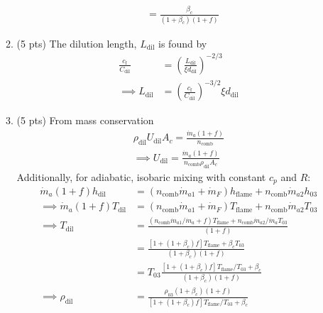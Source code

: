 \documentclass[12pt]{article}
\begin{document}
\begin{enumerate}[label=(\alph*)]
\begin{enumerate}[label=(\roman*)]
\begin{equation}
\begin{aligned}
							&=\boxed{\frac{\beta_c}{(1+\beta_c)(1+f)}}
						\end{aligned}
					\end{equation}
				\item (5 pts)
					The dilution length, $L_\mathrm{dil}$ is found by
					\begin{equation}
						\begin{aligned}
							\frac{c_\mathrm{f}}{C_\mathrm{dil}}&=\left(\frac{L_\mathrm{dil}}{\xi d_\mathrm{dil}}\right)^{-2/3} \\
							\implies L_\mathrm{dil}&=\boxed{\left(\frac{c_\mathrm{f}}{C_\mathrm{dil}}\right)^{-3/2}\xi d_\mathrm{dil}}
						\end{aligned}
					\end{equation}
				\item (5 pts)
					From mass conservation
					\begin{equation}
						\begin{aligned}
							\rho_\mathrm{dil}U_\mathrm{dil}A_c=\frac{\dot{m}_{a}(1+f)}{n_\mathrm{comb}}\\
							\implies U_\mathrm{dil}=\boxed{\frac{\dot{m}_{a}(1+f)}{n_\mathrm{comb}\rho_\mathrm{dil}A_c}}
						\end{aligned}
					\end{equation}
					Additionally, for adiabatic, isobaric mixing with constant $c_p$ and $R$: 
					\begin{equation}
						\begin{aligned}
							\dot{m}_{a}(1+f)h_\mathrm{dil}&=(n_\mathrm{comb}\dot{m}_{a1}+\dot{m}_F)h_\mathrm{flame}+n_\mathrm{comb}\dot{m}_{a2}h_{03}\\
							\implies \dot{m}_{a}(1+f)T_\mathrm{dil}&=(n_\mathrm{comb}\dot{m}_{a1}+\dot{m}_F)T_\mathrm{flame}+n_\mathrm{comb}\dot{m}_{a2}T_{03}\\
							\implies T_\mathrm{dil}&=\frac{(n_\mathrm{comb}\dot{m}_{a1}/\dot{m}_a+f)T_\mathrm{flame}+n_\mathrm{comb}\dot{m}_{a2}/\dot{m}_a T_{03}}{(1+f)}\\
							&=\frac{[1+(1+\beta_c)f]T_\mathrm{flame}+\beta_c T_{03}}{(1+\beta_c)(1+f)}\\
							&=T_{03}\frac{[1+(1+\beta_c)f]T_\mathrm{flame}/T_{03}+\beta_c }{(1+\beta_c)(1+f)}\\
							\implies \rho_\mathrm{dil}&=\boxed{\frac{\rho_{03}(1+\beta_c)(1+f)}{[1+(1+\beta_c)f]T_\mathrm{flame}/T_{03}+\beta_c }}
						\end{aligned}
					\end{equation}
			\end{enumerate}

\end{enumerate}
\end{document}
